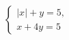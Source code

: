 \begin{ex}
	\begin{condition}
		\( \left\{
		\begin{array}{l}
			|x|+y=5,\\
			x+4y=5
		\end{array}
		\right. \)
	\end{condition}
\end{ex}
